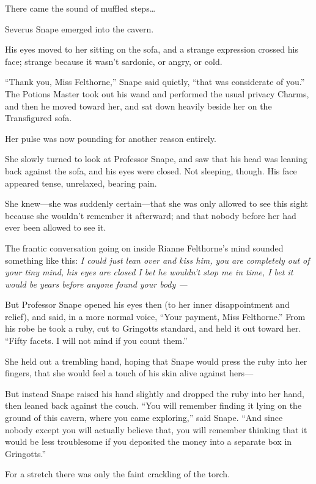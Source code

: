 There came the sound of muffled steps\ldots{}

Severus Snape emerged into the cavern.

His eyes moved to her sitting on the sofa, and a strange expression
crossed his face; strange because it wasn't sardonic, or angry, or cold.

``Thank you, Miss Felthorne,'' Snape said quietly, ``that was
considerate of you.'' The Potions Master took out his wand and performed
the usual privacy Charms, and then he moved toward her, and sat down
heavily beside her on the Transfigured sofa.

Her pulse was now pounding for another reason entirely.

She slowly turned to look at Professor Snape, and saw that his head was
leaning back against the sofa, and his eyes were closed. Not sleeping,
though. His face appeared tense, unrelaxed, bearing pain.

She knew---she was suddenly certain---that she was only allowed to see
this sight because she wouldn't remember it afterward; and that nobody
before her had ever been allowed to see it.

The frantic conversation going on inside Rianne Felthorne's mind sounded
something like this: \emph{I could just lean over and kiss him, you are
completely out of your tiny mind, his eyes are closed I bet he wouldn't
stop me in time, I bet it would be years before anyone found your body
---}

But Professor Snape opened his eyes then (to her inner disappointment
and relief), and said, in a more normal voice, ``Your payment, Miss
Felthorne.'' From his robe he took a ruby, cut to Gringotts standard,
and held it out toward her. ``Fifty facets. I will not mind if you count
them.''

She held out a trembling hand, hoping that Snape would press the ruby
into her fingers, that she would feel a touch of his skin alive against
hers---

But instead Snape raised his hand slightly and dropped the ruby into her
hand, then leaned back against the couch. ``You will remember finding it
lying on the ground of this cavern, where you came exploring,'' said
Snape. ``And since nobody except you will actually believe that, you
will remember thinking that it would be less troublesome if you
deposited the money into a separate box in Gringotts.''

For a stretch there was only the faint crackling of the torch.

